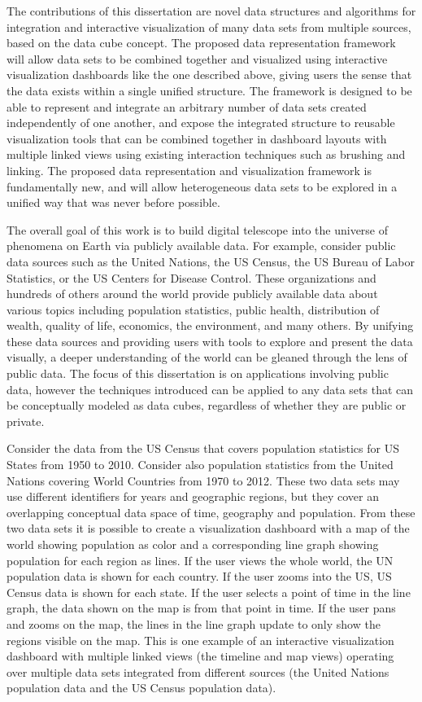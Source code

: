The contributions of this dissertation are novel data structures and algorithms for integration and interactive visualization of many data sets from multiple sources, based on the data cube concept. The proposed data representation framework will allow data sets to be combined together and visualized using interactive visualization dashboards like the one described above, giving users the sense that the data exists within a single unified structure. The framework is designed to be able to represent and integrate an arbitrary number of data sets created independently of one another, and expose the integrated structure to reusable visualization tools that can be combined together in dashboard layouts with multiple linked views using existing interaction techniques such as brushing and linking. The proposed data representation and visualization framework is fundamentally new, and will allow heterogeneous data sets to be explored in a unified way that was never before possible. 

The overall goal of this work is to build digital telescope into the universe of phenomena on Earth via publicly available data. For example, consider public data sources such as the United Nations, the US Census, the US Bureau of Labor Statistics, or the US Centers for Disease Control. These organizations and hundreds of others around the world provide publicly available data about various topics including population statistics, public health, distribution of wealth, quality of life, economics, the environment, and many others. By unifying these data sources and providing users with tools to explore and present the data visually, a deeper understanding of the world can be gleaned through the lens of public data. The focus of this dissertation is on applications involving public data, however the techniques introduced can be applied to any data sets that can be conceptually modeled as data cubes, regardless of whether they are public or private. 

Consider the data from the US Census that covers population statistics for US States from 1950 to 2010. Consider also population statistics from the United Nations covering World Countries from 1970 to 2012. These two data sets may use different identifiers for years and geographic regions, but they cover an overlapping conceptual data space of time, geography and population. From these two data sets it is possible to create a visualization dashboard with a map of the world showing population as color and a corresponding line graph showing population for each region as lines. If the user views the whole world, the UN population data is shown for each country. If the user zooms into the US, US Census data is shown for each state. If the user selects a point of time in the line graph, the data shown on the map is from that point in time. If the user pans and zooms on the map, the lines in the line graph update to only show the regions visible on the map. This is one example of an interactive visualization dashboard with multiple linked views (the timeline and map views) operating over multiple data sets integrated from different sources (the United Nations population data and the US Census population data).

